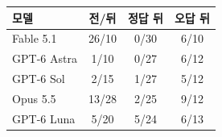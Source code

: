 \setlength{\tabcolsep}{2.4pt}
\small
\begin{tabular}{@{}lccc@{}}
\toprule
모델 & 전/뒤 & 정답 뒤 & 오답 뒤 \\
\midrule
Fable 5.1 & 26/10 & 0/30 & 6/10 \\
GPT-6 Astra & 1/10 & 0/27 & 6/12 \\
GPT-6 Sol & 2/15 & 1/27 & 5/12 \\
Opus 5.5 & 13/28 & 2/25 & 9/12 \\
GPT-6 Luna & 5/20 & 5/24 & 6/13 \\
\bottomrule
\end{tabular}
